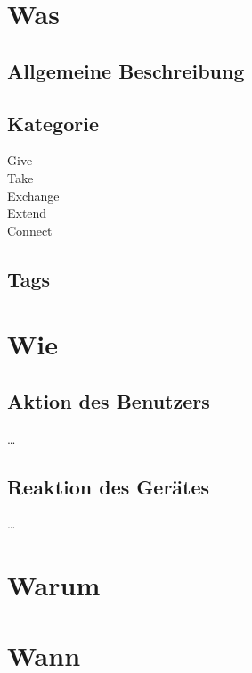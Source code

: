 \maketitle


\section*{Was}

\subsection*{Allgemeine Beschreibung}
\desc

\subsection*{Kategorie}
 Give \\
 Take \\
 Exchange \\
 Extend \\
 Connect

\subsection*{Tags}

\tags

\section*{Wie}


\subsection*{Aktion des Benutzers}
\dots


\subsection*{Reaktion des Gerätes}
\dots

\section*{Warum}

\section*{Wann}

